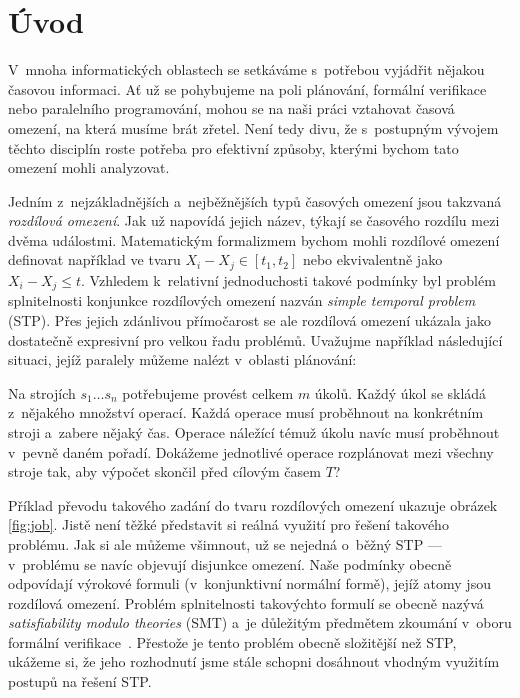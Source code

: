 \chapter*{Úvod}

V~mnoha informatických oblastech se setkáváme s~potřebou vyjádřit nějakou časovou informaci. Ať už se pohybujeme na poli plánování, formální verifikace nebo paralelního programování, mohou se na naši práci vztahovat časová omezení, na která musíme brát zřetel. Není tedy divu, že s~postupným vývojem těchto disciplín roste potřeba pro efektivní způsoby, kterými bychom tato omezení mohli analyzovat.

Jedním z~nejzákladnějších a~nejběžnějších typů časových omezení jsou takzvaná \emph{rozdílová omezení}. Jak už napovídá jejich název, týkají se časového rozdílu mezi dvěma událostmi. Matematickým formalizmem bychom mohli rozdílové omezení definovat například ve tvaru $X_i - X_j \in [t_1, t_2]$ nebo ekvivalentně jako $X_i - X_j \leq t$. Vzhledem k~relativní jednoduchosti takové podmínky byl problém splnitelnosti konjunkce rozdílových omezení nazván \emph{simple temporal problem} (STP). Přes jejich zdánlivou přímočarost se ale rozdílová omezení ukázala jako dostatečně expresivní pro velkou řadu problémů. Uvažujme například následující situaci, jejíž paralely můžeme nalézt v~oblasti plánování: 

\begin{center}
\begin{minipage}{\textwidth}
Na strojích $s_1 \dots s_n$ potřebujeme provést celkem $m$ úkolů. Každý úkol se skládá z~nějakého množství operací. Každá operace musí proběhnout na konkrétním stroji a~zabere nějaký čas. Operace náležící témuž úkolu navíc musí proběhnout v~pevně daném pořadí. Dokážeme jednotlivé operace rozplánovat mezi všechny stroje tak, aby výpočet skončil před cílovým časem $T$?
\end{minipage}
\end{center}

Příklad převodu takového zadání do tvaru rozdílových omezení ukazuje obrázek \ref{fig:job}. Jistě není těžké představit si reálná využití pro řešení takového problému. Jak si ale můžeme všimnout, už se nejedná o~běžný STP --- v~problému se navíc objevují disjunkce omezení. Naše podmínky obecně odpovídají výrokové formuli (v~konjunktivní normální formě), jejíž atomy jsou rozdílová omezení. Problém splnitelnosti takovýchto formulí se obecně nazývá \emph{satisfiability modulo theories} (SMT) a~je důležitým předmětem zkoumání v~oboru formální verifikace~\cite{SMT}. Přestože je tento problém obecně složitější než STP, ukážeme si, že jeho rozhodnutí jsme stále schopni dosáhnout vhodným využitím postupů na řešení STP.

